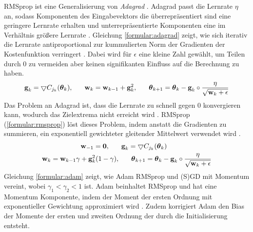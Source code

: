 \newline
RMSprop ist eine Generalisierung von \textit{Adagrad} \cite{mukkamala2017variants}.
Adagrad passt die Lernrate $\eta$ an, sodass Komponenten des Eingabevektors die überrepräsentiert sind eine geringere Lernrate erhalten und
unterrepräsentierte Komponenten eine im Verhältnis größere Lernrate \cite{duchi2011adaptive}.
Gleichung \ref{formular:adagrad} zeigt, wie sich iterativ die Lernrate antiproportional
zur kummulierten Norm der Gradienten der Kostenfunktion verringert \cite{lydia2019adagrad, kingma2014adam}.
Dabei wird für $\epsilon$ eine kleine Zahl gewählt, um Teilen durch 0 zu vermeiden aber keinen signifikanten Einfluss auf die Berechnung zu haben.
\begin{align}
    \label{formular:adagrad}
    \textbf{g}_k = \bigtriangledown C_{j_k}(\boldsymbol\theta_k), \hspace{0.6cm}
    \textbf{w}_k = \textbf{w}_{k-1} + \textbf{g}_k^2, \hspace{0.6cm}
    \boldsymbol\theta_{k+1} = \boldsymbol\theta_k - \textbf{g}_k \circ \frac{\eta}{\sqrt{\textbf{w}_k + \epsilon}}
\end{align}
Das Problem an Adagrad ist, dass die Lernrate zu schnell gegen 0 konvergieren kann, wodurch das Zielextrema nicht erreicht wird \cite{bengio2017deep}.
RMSprop \cite{hinton2012neural} (\ref{formular:rmsprop}) löst dieses Problem, indem anstatt die Gradienten zu summieren, ein
exponentiell gewichteter gleitender Mittelwert verwendet wird \cite{bengio2017deep}.
\begin{align}
    \label{formular:rmsprop}
    \textbf{w}_{-1} = \textbf{0}, \hspace{0.6cm}
    \textbf{g}_k = \bigtriangledown C_{j_k}(\boldsymbol\theta_k) \hspace{2.3cm} \nonumber\\
    \textbf{w}_k = \textbf{w}_{k-1}\gamma + \textbf{g}_k^2 (1-\gamma), \hspace{0.6cm}
    \boldsymbol\theta_{k+1} = \boldsymbol\theta_k - \textbf{g}_k \circ \frac{\eta}{\sqrt{\textbf{w}_k + \epsilon}}
\end{align}
Gleichung \ref{formular:adam} zeigt, wie Adam RMSprop und (S)GD mit Momentum vereint, wobei $\gamma_1 < \gamma_2 < 1$ \cite{kingma2014adam} ist.
Adam beinhaltet RMSprop und hat eine Momentum Komponente, indem der Moment der ersten Ordnung mit exponentieller Gewichtung approximiert wird \cite{bengio2017deep}.
Zudem korrigiert Adam den Bias der Momente der ersten und zweiten Ordnung der durch die Initialisierung entsteht.
